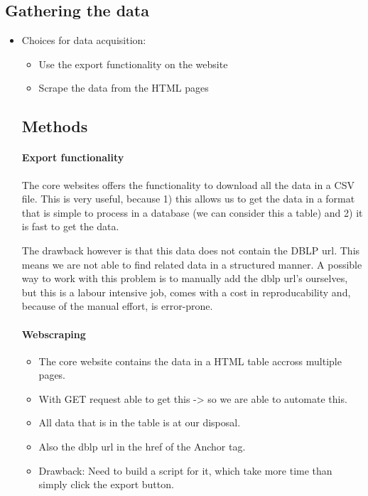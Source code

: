 {\subsection{Gathering the data}
\begin{itemize}
    \item Choices for data acquisition:
    \begin{itemize}
        \item Use the export functionality on the website
        \item Scrape the data from the HTML pages
    \end{itemize}
    \subsection{Methods}
    \paragraph{Export functionality}
    The core websites offers the functionality to download all the data in a CSV file. This is very useful, because 1) this allows us to get the data in a format that is simple to process in a database (we can consider this a table) and 2) it is fast to get the data.
    
    The drawback however is that this data does not contain the DBLP url. This means we are not able to find related data in a structured manner.
    A possible way to work with this problem is to manually add the dblp url's ourselves, but this is a labour intensive job, comes with a cost in reproducability and, because of the manual effort, is error-prone.
    
    \paragraph{Webscraping}
    \begin{itemize}
        \item The core website contains the data in a HTML table accross multiple pages.
        \item With GET request able to get this -> so we are able to automate this.
        \item All data that is in the table is at our disposal.
        \item Also the dblp url in the href of the Anchor tag.
        \item Drawback: Need to build a script for it, which take more time than simply click the export button.
    \end{itemize}
    

\end{itemize}}
